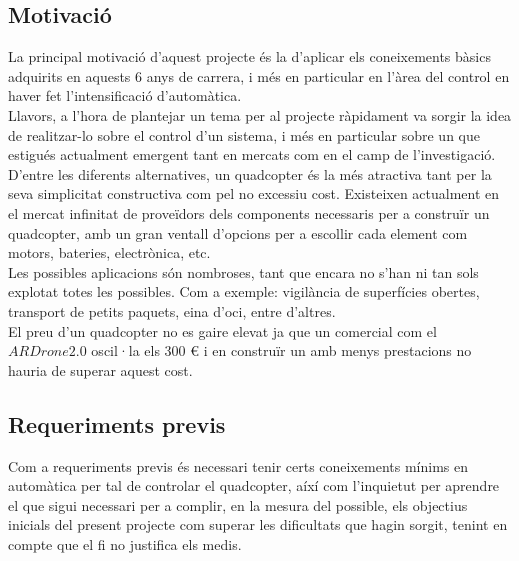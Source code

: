 \documentclass[twoside]{article}
\begin{document}
\subsection{Motivació}

La principal motivació d'aquest projecte és la d'aplicar els coneixements bàsics adquirits en aquests 6 anys de carrera, i més en particular en l'àrea del control en haver fet l'intensificació d'automàtica.\\

Llavors, a l'hora de plantejar un tema per al projecte ràpidament va sorgir la idea de realitzar-lo sobre el control d'un sistema, i més en particular sobre un que estigués actualment emergent tant en mercats com en el camp de l'investigació.\\ 

D'entre les diferents alternatives, un quadcopter és la més atractiva tant per la seva simplicitat constructiva com pel no excessiu cost. Existeixen actualment en el mercat infinitat de proveïdors dels components necessaris per a construïr un quadcopter, amb un gran ventall d'opcions per a escollir cada element com motors, bateries, electrònica, etc.\\

Les possibles aplicacions són nombroses, tant que encara no s'han ni tan sols explotat totes les possibles. Com a exemple: vigilància de superfícies obertes, transport de petits paquets, eina d'oci, entre d'altres.\\


El preu d'un quadcopter no es gaire elevat ja que un comercial com el $AR Drone 2.0$ oscil·la els 300 € i en construïr un amb menys prestacions no hauria de superar aquest cost.

\subsection{Requeriments previs}

Com a requeriments previs és necessari tenir certs coneixements mínims en automàtica per tal de controlar el quadcopter, aíxí com l'inquietut per aprendre el que sigui necessari per a complir, en la mesura del possible, els objectius inicials del present projecte com superar les dificultats que hagin sorgit, tenint en compte que el fi no justifica els medis.
 
\newpage
\end{document}
